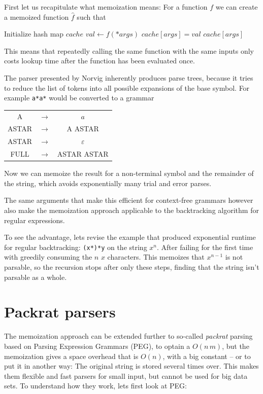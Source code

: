\documentclass[11pt]{Thesis}
\theoremstyle{definition}
\begin{document}
First let us recapitulate what memoization means: For a function $f$ we can 
create a memoized function $\hat f$ such that
\begin{algorithmic}
  \State Initialize hash map $cache$
  \State $val\leftarrow f(*args)$
  \State $cache[args] = val$
  \EndIf
  \State \Return $cache[args]$
  \EndFunction
\end{algorithmic}
This means that repeatedly calling the same function with  the same inputs 
only costs lookup time after the function has been evaluated once.

The parser presented by Norvig inherently produces parse trees, because it 
tries to reduce the list of tokens into all possible expansions of the base
symbol. For example \texttt{a*a*} would be converted to a grammar

\begin{center}
\begin{tabular}{ccc}
A& $\rightarrow$ & $a$\\
ASTAR & $\rightarrow$ & A ASTAR \\
ASTAR & $\rightarrow$ & $\varepsilon$ \\
FULL & $\rightarrow$ & ASTAR ASTAR \\
\end{tabular}
\end{center}

Now we can memoize the result for a non-terminal symbol and the remainder of
the string, which avoids exponentially many trial and error parses.

The same arguments that make this efficient for context-free grammars however 
also make the memoization approach applicable to the backtracking algorithm 
for regular expressions.

To see the advantage, lets revise the example that produced exponential runtime
for regular backtracking: \texttt{(x*)*y} on the string $x^n$. After failing 
for the first time with greedily consuming the $n$ $x$ characters. This 
memoizes that $x^{n-1}$ is not parsable, so the recursion stops after only 
these steps, finding that the string isn't parsable as a whole.

\section{Packrat parsers}
The memoization approach can be extended further to so-called \emph{packrat}
parsing\cite{Mede11a} based on Parsing Expression Grammars (PEG), to optain a
$O(n\,m)$, but the memoization gives a space overhead that is
$O(n)$, with a big constant\cite{Ford02a} -- or to put it in another way: The
original string is stored several times over. This makes them flexible and fast
parsers for small input, but cannot be used for big data sets. To understand
how they work, lets first look at PEG:
\end{document}
